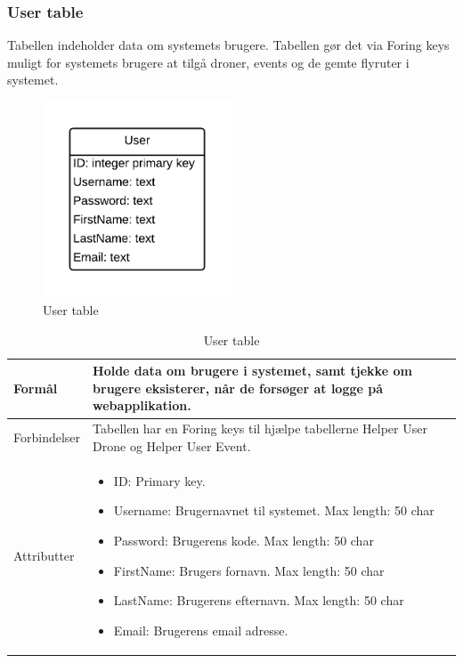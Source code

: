 \subsubsection*{User table}
Tabellen indeholder data om systemets brugere. Tabellen gør det via Foring keys muligt for systemets brugere at tilgå droner, events og de gemte flyruter i systemet.
\vspace{-5pt}
\begin{figure}[H]
	\centering
	\includegraphics[width=0.5\textwidth]{Billeder/database/UserTabel.png}
	\vspace{-5pt}
	\caption{User table}
	\label{fig:user_table}
\end{figure}

\begin{table}[H]
\begin{tabular}{| p{3cm}| p{11.5cm}|}
\hline

Formål	 							& Holde data om brugere i systemet, samt tjekke om brugere eksisterer, når de forsøger at logge på webapplikation.\\\hline
Forbindelser						& Tabellen har en Foring keys til hjælpe tabellerne Helper User Drone og Helper User Event.\\\hline
Attributter						& \begin{itemize}
												\item ID: Primary key.
												\item Username: Brugernavnet til systemet. Max length: 50 char
												\item Password: Brugerens kode. Max length: 50 char
												\item FirstName: Brugers fornavn. Max length: 50 char
												\item LastName: Brugerens efternavn. Max length: 50 char
												\item Email: Brugerens email adresse.
											\end{itemize} \\\hline 
\end{tabular}
\caption{User table}
\label{tab:user_table}
\end{table}